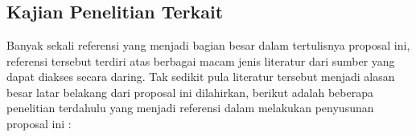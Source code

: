 \chapter{\babDua}

\section{Kajian Penelitian Terkait}
Banyak sekali referensi yang menjadi bagian besar dalam tertulisnya proposal ini, referensi tersebut terdiri atas berbagai macam jenis literatur dari sumber yang dapat diakses secara daring. Tak sedikit pula literatur tersebut menjadi alasan besar latar belakang dari proposal ini dilahirkan, berikut adalah beberapa penelitian terdahulu yang menjadi referensi dalam melakukan penyusunan proposal ini :
